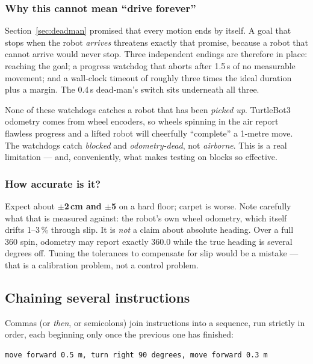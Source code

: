 \documentclass[11pt,a4paper]{article}
\newenvironment{warnbox}%
  {\par\medskip\begin{lrbox}{\warnboxsave}%
   \begin{minipage}{\dimexpr\linewidth-2\fboxsep-2\fboxrule\relax}}%
  {\end{minipage}\end{lrbox}%
   \noindent\fcolorbox{warnrule}{warnbg}{\usebox{\warnboxsave}}\par\medskip}
\begin{document}
\subsubsection{Why this cannot mean ``drive forever''}
Section~\ref{sec:deadman} promised that every motion ends by itself. A goal that
stops when the robot \emph{arrives} threatens exactly that promise, because a
robot that cannot arrive would never stop. Three independent endings are
therefore in place: reaching the goal; a progress watchdog that aborts after
1.5\,s of no measurable movement; and a wall-clock timeout of roughly three
times the ideal duration plus a margin. The 0.4\,s dead-man's switch sits
underneath all three.

\begin{warnbox}
None of these watchdogs catches a robot that has been \emph{picked up}.
TurtleBot3 odometry comes from wheel encoders, so wheels spinning in the air
report flawless progress and a lifted robot will cheerfully ``complete'' a
1-metre move. The watchdogs catch \emph{blocked} and \emph{odometry-dead}, not
\emph{airborne}. This is a real limitation --- and, conveniently, what makes
testing on blocks so effective.
\end{warnbox}

\subsubsection{How accurate is it?}
Expect about \textbf{$\pm$2\,cm and $\pm$5\textdegree} on a hard floor; carpet is
worse. Note carefully what that is measured against: the robot's own wheel
odometry, which itself drifts 1--3\,\% through slip. It is \emph{not} a claim
about absolute heading. Over a full 360\textdegree{} spin, odometry may report
exactly 360.0 while the true heading is several degrees off. Tuning the
tolerances to compensate for slip would be a mistake --- that is a calibration
problem, not a control problem.

\subsection{Chaining several instructions}
\label{sec:chaining}
Commas (or \emph{then}, or semicolons) join instructions into a sequence, run
strictly in order, each beginning only once the previous one has finished:

\begin{lstlisting}[style=bash]
move forward 0.5 m, turn right 90 degrees, move forward 0.3 m
\end{lstlisting}
\end{document}
